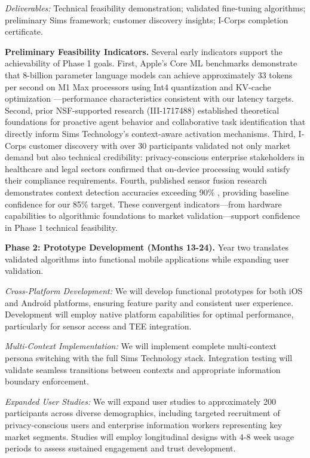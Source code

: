 \documentclass[11pt]{article}
\begin{document}
\textit{Deliverables:} Technical feasibility demonstration; validated fine-tuning algorithms; preliminary Sims framework; customer discovery insights; I-Corps completion certificate.

\textbf{Preliminary Feasibility Indicators.} Several early indicators support 
the achievability of Phase 1 goals. First, Apple's Core ML benchmarks 
demonstrate that 8-billion parameter language models can achieve approximately 
33 tokens per second on M1 Max processors using Int4 quantization and 
KV-cache optimization \cite{apple2024coreml}---performance characteristics 
consistent with our latency targets. Second, prior NSF-supported research 
(III-1717488) established theoretical foundations for proactive agent behavior 
and collaborative task identification that directly inform Sims Technology's 
context-aware activation mechanisms. Third, I-Corps customer discovery with 
over 30 participants validated not only market demand but also technical 
credibility: privacy-conscious enterprise stakeholders in healthcare and legal 
sectors confirmed that on-device processing would satisfy their compliance 
requirements. Fourth, published sensor fusion research demonstrates context 
detection accuracies exceeding 90\% \cite{wang2019deep}, providing baseline 
confidence for our 85\% target. These convergent indicators---from hardware 
capabilities to algorithmic foundations to market validation---support 
confidence in Phase 1 technical feasibility.

\textbf{Phase 2: Prototype Development (Months 13-24).}
Year two translates validated algorithms into functional mobile applications while expanding user validation.

\textit{Cross-Platform Development:} We will develop functional prototypes for both iOS and Android platforms, ensuring feature parity and consistent user experience. Development will employ native platform capabilities for optimal performance, particularly for sensor access and TEE integration.

\textit{Multi-Context Implementation:} We will implement complete multi-context persona switching with the full Sims Technology stack. Integration testing will validate seamless transitions between contexts and appropriate information boundary enforcement.

\textit{Expanded User Studies:} We will expand user studies to approximately 200 participants across diverse demographics, including targeted recruitment of privacy-conscious users and enterprise information workers representing key market segments. Studies will employ longitudinal designs with 4-8 week usage periods to assess sustained engagement and trust development.
\end{document}
